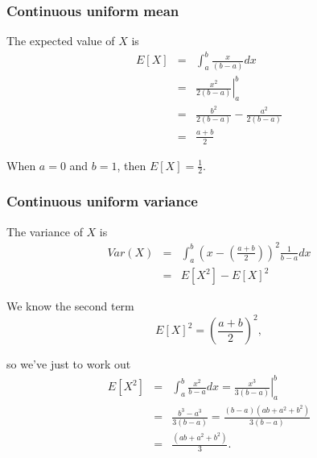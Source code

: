 \documentclass[notes=show,smaller,handout]{beamer}\usepackage[]{graphicx}\usepackage[]{color}
\begin{document}
\begin{frame}%

\frametitle{Continuous uniform mean}

The expected value of $X$ is%
\begin{eqnarray*}
E\left[ X\right] &=&\int_{a}^{b}\frac{x}{\left( b-a\right) }dx \\
&=&\left. \frac{x^{2}}{2\left( b-a\right) }\right\vert _{a}^{b} \\
&=&\frac{b^{2}}{2\left( b-a\right) }-\frac{a^{2}}{2\left( b-a\right) } \\
&=&\frac{a+b}{2}
\end{eqnarray*}

\begin{example}
When $a=0$ and $b=1$, then $E\left[ X\right] =\frac{1}{2}$.
\end{example}
\end{frame}%

\begin{frame}%

\frametitle{Continuous uniform variance}

The variance of $X$ is%
\begin{eqnarray*}
Var\left( X\right) &=&\int_{a}^{b}\left( x-\left( \frac{a+b}{2}\right)
\right) ^{2}\frac{1}{b-a}dx \\
&=&E\left[ X^{2}\right] -E\left[ X\right] ^{2}
\end{eqnarray*}

We know the second term
\begin{equation*}
E\left[ X\right] ^{2}=\left( \frac{a+b}{2}\right) ^{2},
\end{equation*}

so we've just to work out%
\begin{eqnarray*}
E\left[ X^{2}\right] &=&\int_{a}^{b}\frac{x^{2}}{b-a}dx =\left. \frac{x^{3}}{3\left( b-a\right) }\right\vert _{a}^{b} \\
&=&\frac{b^{3}-a^{3}}{3\left( b-a\right) } = \frac{(b-a)\left( ab+a^{2}+b^{2}\right)}{3\left( b-a\right) } \\
&=&\frac{\left( ab+a^{2}+b^{2}\right) }{3}.
\end{eqnarray*}


\end{frame}%
\end{document}
